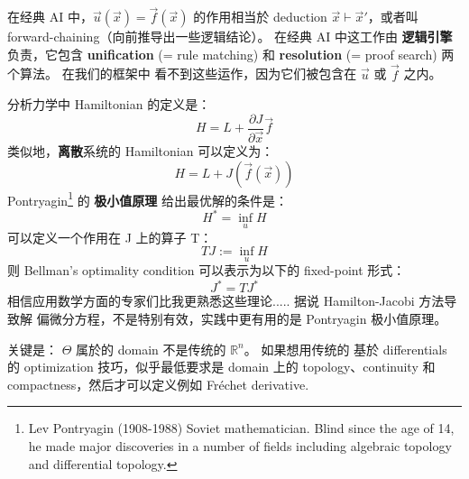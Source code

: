 \documentclass[12pt, orivec]{article}
\begin{document}
\footnotesize
在经典 AI 中，$\vec{u}(\vec{x}) = \vec{f}(\vec{x})$ 的作用相当於 deduction $\vec{x} \vdash \vec{x}'$，或者叫 forward-chaining（向前推导出一些逻辑结论）。  在经典 AI 中这工作由 \textbf{逻辑引擎} 负责，它包含 \textbf{unification} (= rule matching) 和 \textbf{resolution} (= proof search) 两个算法。  在我们的框架中 看不到这些运作，因为它们被包含在 $\vec{u}$ 或 $\vec{f}$ 之内。 
\normalsize


分析力学中 Hamiltonian 的定义是：
\begin{equation}
H = L + \frac{\partial J}{\partial \vec{x}} \vec{f}
\end{equation}
类似地，\textbf{离散}系统的 Hamiltonian 可以定义为：
\begin{equation}
H = L + J ( \vec{f}(\vec{x}) )
\end{equation}
Pontryagin\footnote{Lev Pontryagin (1908-1988) Soviet mathematician. Blind since the age of 14, he made major discoveries in a number of fields including algebraic topology and differential topology.} 的 \textbf{极小值原理} 给出最优解的条件是：
\begin{equation}
H^* = \inf_u H
\end{equation}
可以定义一个作用在 J 上的算子 T：
\begin{equation}
T J := \inf_u H
\end{equation}
则 Bellman's optimality condition 可以表示为以下的 fixed-point 形式：
\begin{equation}
J^* = T J^*
\end{equation}
相信应用数学方面的专家们比我更熟悉这些理论..... 据说 Hamilton-Jacobi 方法导致解 偏微分方程，不是特别有效，实践中更有用的是 Pontryagin 极小值原理。 

关键是： $\Theta$ 属於的 domain 不是传统的 $\mathbb{R}^n$。 如果想用传统的 基於 differentials 的 optimization 技巧，似乎最低要求是 domain 上的 topology、continuity 和 compactness，然后才可以定义例如 Fr\'{e}chet derivative.
\end{document}
